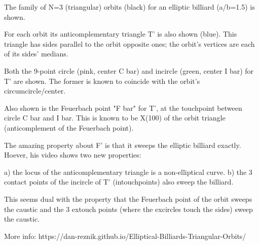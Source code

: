 The family of N=3 (triangular) orbits (black) for an elliptic billiard (a/b=1.5) is shown.

For each orbit its anticomplementary triangle T' is also shown (blue). This triangle has sides parallel to the orbit opposite ones; the orbit's vertices are each of its sides' medians.

Both the 9-point circle (pink, center C bar) and incircle (green, center I bar) for T' are shown. The former is known to coincide with the orbit's circumcircle/center.

Also shown is the Feuerbach point "F bar" for T', at the touchpoint between circle C bar and I bar. This is known to be X(100) of the orbit triangle (anticomplement of the Feuerbach point).

The amazing property about F' is that it sweeps the elliptic billiard exactly. Hoever, his video shows two new properties:

a) the locus of the anticomplementary triangle is a non-elliptical curve.
b) the 3 contact points of the incircle of T' (intouchpoints) also sweep the billiard.

This seems dual with the property that the Feuerbach point of the orbit sweeps the caustic and the 3 extouch points (where the excircles touch the sides) sweep the caustic.

More info: https://dan-reznik.github.io/Elliptical-Billiards-Triangular-Orbits/